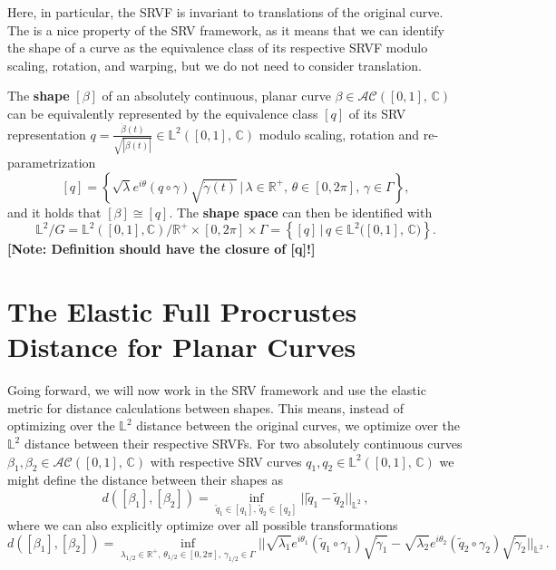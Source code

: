 \noindent Here, in particular, the SRVF is invariant to translations of the original curve.
The is a nice property of the SRV framework, as it means that we can identify the shape of a curve as the equivalence class of its respective SRVF modulo scaling, rotation, and warping, but we do not need to consider translation.

\begin{definition}
  The \textbf{shape} $[\beta]$ of an absolutely continuous, planar curve $\beta \in \mathcal{AC}([0,1],\, \mathbb{C})$ can be equivalently represented by the equivalence class $[q]$ of its SRV representation $q = \frac{\dot\beta(t)}{\sqrt{|\dot\beta(t)|}} \in \mathbb{L}^2([0,1],\,\mathbb{C})$ modulo scaling, rotation and re-parametrization
  $$[q] = \left\{\sqrt\lambda e^{i\theta}(q \circ \gamma) \sqrt{\dot\gamma(t)} \,|\, \lambda \in \mathbb{R}^+,\, \theta \in [0,2\pi],\, \gamma
  \in \Gamma\right\},$$
  and it holds that $[\beta] \cong [q]$. The \textbf{shape space} can then be identified with 
  $$\mathbb{L}^2 \big/ G = \mathbb{L}^2([0,1], \mathbb{C}) \big/ \mathbb{R}^+ \times [0,2\pi] \times \Gamma = \left\{[q]\,|\,q \in \mathbb{L}^2({[0,1],\,\mathbb{C})}\right\}.$$
  \textbf{[Note: Definition should have the closure of [q]!]}
\end{definition}



\section{The Elastic Full Procrustes Distance for Planar Curves}
\label{theo:proc}
Going forward, we will now work in the SRV framework and use the elastic metric for distance calculations between shapes.
This means, instead of optimizing over the $\mathbb{L}^2$ distance between the original curves, we optimize over the $\mathbb{L}^2$ distance between their respective SRVFs.
For two absolutely continuous curves $\beta_1, \beta_2 \in \mathcal{AC}([0,1],\,\mathbb{C})$ with respective SRV curves $q_1, q_2 \in \mathbb{L}^2([0,1],\,\mathbb{C})$ we might define the distance between their shapes as
$$d([\beta_1], [\beta_2]) = 
  \inf_{\tilde q_1 \in [q_1],\,\tilde q_2 \in [q_2]} || \tilde q_1 - \tilde q_2 ||_{\mathbb{L}^2}\,,$$
where we can also explicitly optimize over all possible transformations
$$d([\beta_1], [\beta_2]) = 
  \inf_{\lambda_{1/2} \in \mathbb{R}^+,\,\theta_{1/2} \in [0,2\pi],\, \gamma_{1/2} \in \Gamma} || \sqrt{\lambda_1} e^{i\theta_1}(\tilde q_1 \circ \gamma_1) \sqrt{\dot\gamma_1} - \sqrt{\lambda_2} e^{i\theta_2}(\tilde q_2 \circ \gamma_2) \sqrt{\dot\gamma_2} ||_{\mathbb{L}^2}\,.$$

